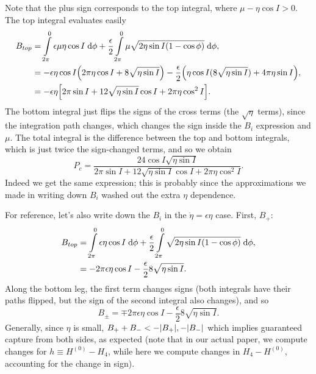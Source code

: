 \documentclass[11pt,
        usenames, %
        dvipsnames %
    ]{article}
\DeclarePairedDelimiter\abs{\lvert}{\rvert}
\DeclarePairedDelimiter\p{\lparen}{\rparen}
\DeclarePairedDelimiter\s{\lbrack}{\rbrack}
\begin{document}
Note that the plus sign corresponds to the top integral, where $\mu - \eta \cos
I > 0$. The top integral evaluates easily
\begin{align*}
    B_{top} &= \int\limits_{2\pi}^0 \epsilon \mu \eta \cos I\;\mathrm{d}\phi
            + \frac{\epsilon}{2}\int\limits_{2\pi}^0
                \mu\sqrt{2\eta \sin I\p*{1 - \cos \phi}}\;\mathrm{d}\phi,\\
        &= -\epsilon \eta \cos I\p*{2\pi \eta \cos I + 8\sqrt{\eta \sin I}}
            - \frac{\epsilon}{2}\p*{\eta \cos I (8\sqrt{\eta \sin I})
            + 4\pi \eta \sin I},\\
        &= -\epsilon \eta \s*{
            2\pi \sin I + 12\sqrt{\eta \sin I}\cos I + 2\pi \eta \cos^2 I}.
\end{align*}
The bottom integral just flips the signs of the cross terms (the $\sqrt{\eta}$
terms), since the integration path changes, which changes the sign inside the
$B_i$ expression and $\mu$. The total integral is the difference between the top
and bottom integrals, which is just twice the sign-changed terms, and so we
obtain
\begin{equation}
    P_c = \frac{24\cos I \sqrt{\eta \sin I}}{
            2\pi \sin I + 12\sqrt{\eta \sin I}\cos I + 2\pi \eta \cos^2 I}.
\end{equation}
Indeed we get the same expression; this is probably since the approximations we
made in writing down $B_i$ washed out the extra $\eta$ dependence.

For reference, let's also write down the $B_i$ in the $\dot{\eta} = \epsilon
\eta$ case. First, $B_{+}$:
\begin{align*}
    B_{top} &= \int\limits_{2\pi}^0 \epsilon \eta \cos I\;\mathrm{d}\phi
            + \frac{\epsilon}{2}\int\limits_{2\pi}^0
                \sqrt{2\eta \sin I\p*{1 - \cos \phi}}\;\mathrm{d}\phi,\\
        &= -2\pi \epsilon \eta \cos I - \frac{\epsilon}{2}8\sqrt{\eta \sin I}.
\end{align*}
Along the bottom leg, the first term changes signs (both integrals have their
paths flipped, but the sign of the second integral also changes), and so
\begin{equation}
    B_{\pm} = \mp 2\pi \epsilon \eta \cos I
        - \frac{\epsilon}{2}8\sqrt{\eta \sin I}.
\end{equation}
Generally, since $\eta$ is small, $B_{+} + B_- < -\abs*{B_+}, -\abs*{B_-}$ which
implies guaranteed capture from both sides, as expected (note that in our actual
paper, we compute changes for $h \equiv H^{(0)} - H_4$, while here we compute
changes in $H_4 - H^{(0)}$, accounting for the change in sign).
\end{document}
